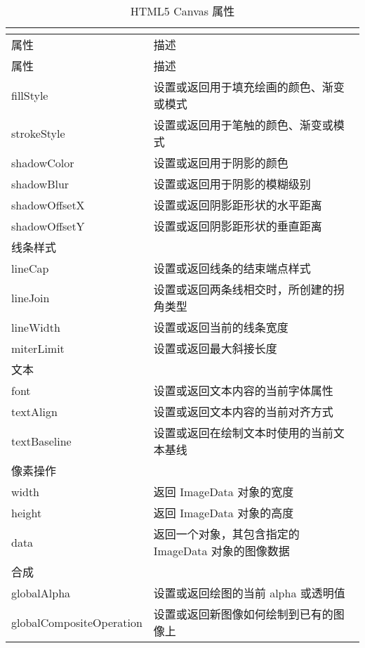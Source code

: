 \begin{longtable}{|p{120pt}|p{270pt}|}
\multicolumn{2}{r}{}
\tabularnewline\hline
属性		&描述
\endhead

\caption{HTML5 Canvas 属性}\\
\hline
属性		&描述
\endfirsthead

\multicolumn{2}{r}{}
\endfoot

\endlastfoot

\hline
\multicolumn{2}{|l|}{颜色、样式和阴影}\\
\hline
fillStyle			&设置或返回用于填充绘画的颜色、渐变或模式\\
\hline
strokeStyle		&设置或返回用于笔触的颜色、渐变或模式\\
\hline
shadowColor		&设置或返回用于阴影的颜色\\
\hline
shadowBlur		&设置或返回用于阴影的模糊级别\\
\hline
shadowOffsetX	&设置或返回阴影距形状的水平距离\\
\hline
shadowOffsetY	&设置或返回阴影距形状的垂直距离\\
\hline
\multicolumn{2}{|l|}{线条样式}	\\
\hline
lineCap			&设置或返回线条的结束端点样式\\
\hline
lineJoin			&设置或返回两条线相交时，所创建的拐角类型\\
\hline
lineWidth			&设置或返回当前的线条宽度\\
\hline
miterLimit		&设置或返回最大斜接长度\\
\hline
\multicolumn{2}{|l|}{文本}\\
\hline
font				&设置或返回文本内容的当前字体属性\\
\hline
textAlign			&设置或返回文本内容的当前对齐方式\\
\hline
textBaseline		&设置或返回在绘制文本时使用的当前文本基线\\
\hline
\multicolumn{2}{|l|}{像素操作}\\
\hline
width			&返回 ImageData 对象的宽度\\
\hline
height			&返回 ImageData 对象的高度\\
\hline
data				&返回一个对象，其包含指定的 ImageData 对象的图像数据\\
\hline
\multicolumn{2}{|l|}{合成}\\
\hline
globalAlpha		&设置或返回绘图的当前 alpha 或透明值\\
\hline
globalCompositeOperation&	设置或返回新图像如何绘制到已有的图像上\\
\hline
\end{longtable}


